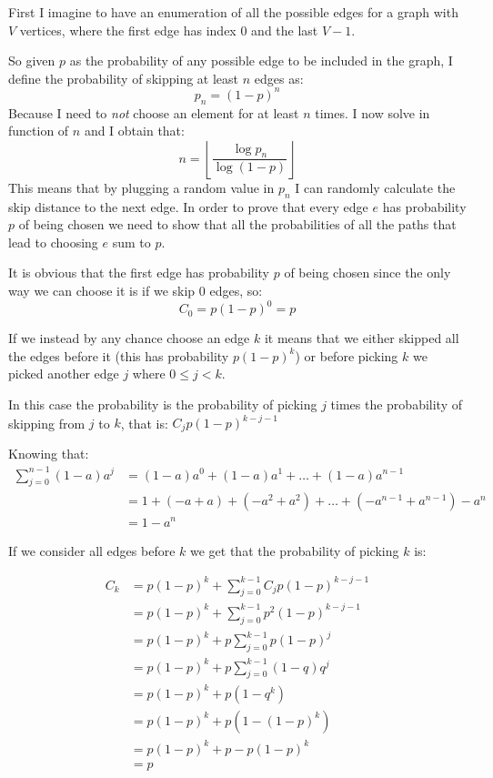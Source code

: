 \documentclass{article}
\begin{document}
First I imagine to have an enumeration of all the possible edges for a graph with $V$ vertices, where the first edge has index $0$ and the last $V-1$.

So given $p$ as the probability of any possible edge to be included in the graph, I define the probability of skipping at least $n$ edges as:
$$p_n = (1-p)^n$$ 
Because I need to \emph{not} choose an element for at least $n$ times. I now solve in function of $n$ and I obtain that:
$$n = \left\lfloor\frac{\log{p_n}}{\log{(1-p)}}\right\rfloor$$
This means that by plugging a random value in $p_n$ I can randomly calculate the skip distance to the next edge.
In order to prove that every edge $e$ has probability $p$ of being chosen we need to show that all the probabilities of all the paths that lead to choosing $e$ sum to $p$.

It is obvious that the first edge has probability $p$ of being chosen since the only way we can choose it is if we skip $0$ edges, so: 
$$C_0 = p(1-p)^0 = p$$

If we instead by any chance choose an edge $k$ it means that we either skipped all the edges before it (this has probability $p(1-p)^k$) or before picking $k$ we picked another edge $j$ where $0 \leq j < k$. 

In this case the probability is the probability of picking $j$ times the probability of skipping from $j$ to $k$, that is: $C_jp(1-p)^{k-j-1}$

Knowing that:
\begin{align*}
\sum_{j=0}^{n-1} (1-a)a^j &= (1-a)a^0 + (1-a)a^1 + \ldots + (1-a)a^{n-1}
\\ &= 1+(- a + a)+(- a^2 + a^2) + \ldots + (- a^{n-1}+ a^{n-1}) - a^n 
\\ &= 1 - a^n
\end{align*}

If we consider all edges before $k$ we get that the probability of picking $k$ is:

\begin{align*}
C_k &= p(1-p)^k + \sum_{j=0}^{k-1} C_j p(1-p)^{k-j-1}
\\ &= p(1-p)^k + \sum_{j=0}^{k-1} p^2(1-p)^{k-j-1} \tag{Assume by induction that $C_j = p$}
\\ &= p(1-p)^k + p\sum_{j=0}^{k-1} p(1-p)^{j}
\\ &= p(1-p)^k + p\sum_{j=0}^{k-1} (1-q)q^{j} \tag{With $q=(1-p)$}
\\ &= p(1-p)^k + p(1 - q^k)
\\ &= p(1-p)^k + p(1 - (1-p)^k)
\\ &= p(1-p)^k + p - p(1-p)^k
\\ &= p
\end{align*}
\end{document}
